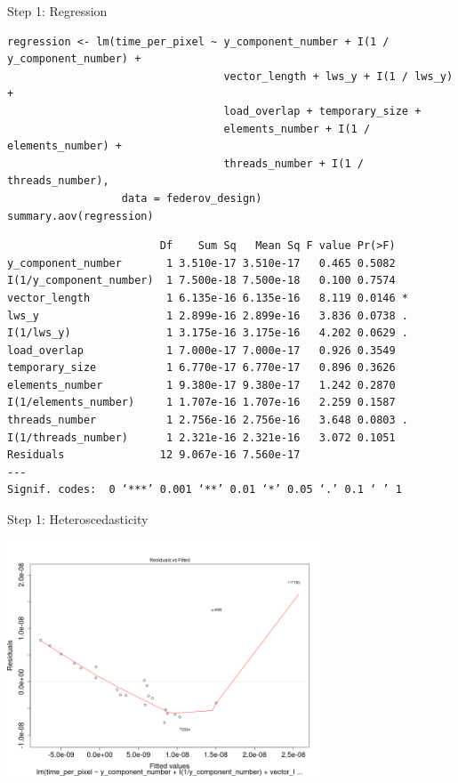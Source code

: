 \documentclass[10pt, compress, aspectratio=169, xcolor={table,usenames,dvipsnames}]{beamer}
\begin{document}
\begin{frame}[fragile,label={sec:orgcba6b9b}]{Step 1: Regression}
 \scriptsize
\lstset{language=r,label= ,caption= ,captionpos=b,numbers=none}
\begin{lstlisting}
regression <- lm(time_per_pixel ~ y_component_number + I(1 / y_component_number) +
                                  vector_length + lws_y + I(1 / lws_y) +
                                  load_overlap + temporary_size +
                                  elements_number + I(1 / elements_number) +
                                  threads_number + I(1 / threads_number),
                  data = federov_design)
summary.aov(regression)
\end{lstlisting}

\begin{verbatim}
                        Df    Sum Sq   Mean Sq F value Pr(>F)
y_component_number       1 3.510e-17 3.510e-17   0.465 0.5082
I(1/y_component_number)  1 7.500e-18 7.500e-18   0.100 0.7574
vector_length            1 6.135e-16 6.135e-16   8.119 0.0146 *
lws_y                    1 2.899e-16 2.899e-16   3.836 0.0738 .
I(1/lws_y)               1 3.175e-16 3.175e-16   4.202 0.0629 .
load_overlap             1 7.000e-17 7.000e-17   0.926 0.3549
temporary_size           1 6.770e-17 6.770e-17   0.896 0.3626
elements_number          1 9.380e-17 9.380e-17   1.242 0.2870
I(1/elements_number)     1 1.707e-16 1.707e-16   2.259 0.1587
threads_number           1 2.756e-16 2.756e-16   3.648 0.0803 .
I(1/threads_number)      1 2.321e-16 2.321e-16   3.072 0.1051
Residuals               12 9.067e-16 7.560e-17
---
Signif. codes:  0 ‘***’ 0.001 ‘**’ 0.01 ‘*’ 0.05 ‘.’ 0.1 ‘ ’ 1
\end{verbatim}

\normalsize
\end{frame}

\begin{frame}[label={sec:org55b0874}]{Step 1: Heteroscedasticity}
\begin{center}
\includegraphics[width=0.7\textwidth]{../img/regression_before_transform.png}
\end{center}
\end{frame}
\end{document}
